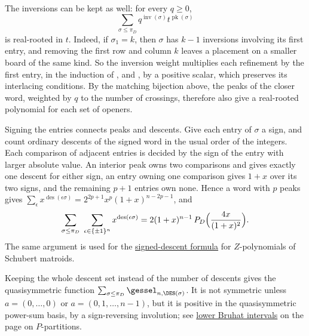 The inversions can be kept as well: for every $q\geq0$,
\[
  \sum_{\sigma\leq\pi_D}q^{\operatorname{inv}(\sigma)}t^{\operatorname{pk}(\sigma)}
\]
is real-rooted in $t$.  Indeed, if $\sigma_1=k$, then $\sigma$ has $k-1$
inversions involving its first entry, and removing the first row and column $k$
leaves a placement on a smaller board of the same kind.  So the inversion
weight multiplies each refinement by the first entry, in the induction of
,  and , by a
positive scalar, which preserves its interlacing conditions.  By the matching
bijection above, the peaks of the closer word, weighted by $q$ to the number
of crossings, therefore also give a real-rooted polynomial for each set of
openers.

Signing the entries connects peaks and descents.  Give each entry of
$\sigma$ a sign, and count ordinary descents of the signed word in the usual
order of the integers.  Each comparison of adjacent entries is decided by the
sign of the entry with larger absolute value.  An interior peak owns two
comparisons and gives exactly one descent for either sign, an entry owning one
comparison gives $1+x$ over its two signs, and the remaining $p+1$ entries own
none.  Hence a word with $p$ peaks gives
$\sum_{\epsilon}x^{\operatorname{des}(\epsilon\sigma)}
=2^{2p+1}x^p(1+x)^{n-2p-1}$, and
\[
  \sum_{\sigma\leq\pi_D}\ \sum_{\epsilon\in\{\pm1\}^n}
  x^{\operatorname{des}(\epsilon\sigma)}
  =2(1+x)^{n-1}\,P_D\Bigl(\frac{4x}{(1+x)^2}\Bigr).
\]
The same argument is used for the
\hyperref[schubertMatroidZPermutations]{signed-descent formula} for
$Z$-polynomials of Schubert matroids.

Keeping the whole descent set instead of the number of descents gives the
quasisymmetric function $\sum_{\sigma\leq\pi_D}\gessel_{n,\DES(\sigma)}$.  It is
not symmetric unless $a=(0,\dotsc,0)$ or $a=(0,1,\dotsc,n-1)$, but it is
positive in the quasisymmetric power-sum basis, by a sign-reversing involution;
see \hyperref[bruhatIntervalPsiPositive]{lower Bruhat intervals} on the page on
$P$-partitions.


